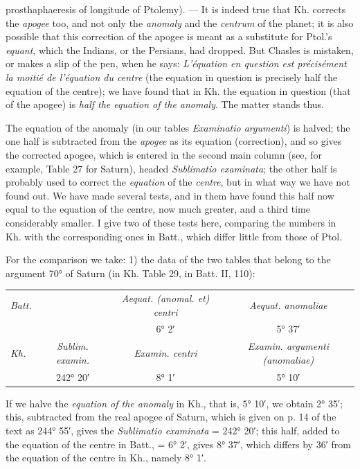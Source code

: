 \documentclass[11pt]{article}
\newcommand{\Pg}[1]{\marginpar{\footnotesize\color{gray}#1}}
\begin{document}
prosthaphaeresis of longitude of Ptolemy). — It is indeed true that Kh. corrects the \emph{apogee} too, and not only the \emph{anomaly} and the \emph{centrum} of the planet; it is also possible that this correction of the apogee is meant as a substitute for Ptol.'s \Pg{50}\emph{equant}, which the Indians, or the Persians, had dropped. But Chasles is mistaken, or makes a slip of the pen, when he says: \emph{L’équation en question est précisément la moitié de l’équation du centre} (the equation in question is precisely half the equation of the centre); we have found that in Kh. the equation in question (that of the apogee) is \emph{half the equation of the anomaly}. The matter stands thus.\par
\par The equation of the anomaly (in our tables \emph{Examinatio argumenti}) is halved; the one half is subtracted from the \emph{apogee} as its equation (correction), and so gives the corrected apogee, which is entered in the second main column (see, for example, Table 27 for Saturn), headed \emph{Sublimatio examinata}; the other half is probably used to correct the \emph{equation} of the \emph{centre}, but in what way we have not found out. We have made several tests, and in them have found this half now equal to the equation of the centre, now much greater, and a third time considerably smaller. I give two of these tests here, comparing the numbers in Kh. with the corresponding ones in Batt., which differ little from those of Ptol.\par
\par For the comparison we take: 1) the data of the two tables that belong to the argument 70° of Saturn (in Kh. Table 29, in Batt. II, 110):\par
\begin{center}\small\begin{tabular}{lccc}
\emph{Batt.} &  & \emph{Aequat. (anomal. et) centri} & \emph{Aequat. anomaliae} \\
 &  & 6° 2′ & 5° 37′ \\
\emph{Kh.} & \emph{Sublim. examin.} & \emph{Examin. centri} & \emph{Examin. argumenti (anomaliae)} \\
 & 242° 20′ & 8° 1′ & 5° 10′ \\
\end{tabular}\end{center}
\par If we halve the \emph{equation of the anomaly} in Kh., that is, 5° 10′, we obtain 2° 35′; this, subtracted from the real apogee of Saturn, which is given on p. 14 of the text as 244° 55′, gives the \emph{Sublimatio examinata} = 242° 20′; this half, added to the equation of the centre in Batt., = 6° 2′, gives 8° 37′, which differs by 36′ from the equation of the centre in Kh., namely 8° 1′.\par
\end{document}

